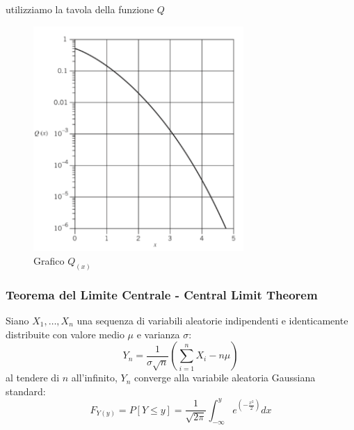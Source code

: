             utilizziamo la tavola della funzione $Q$
            \begin{figure}[H]
                \centering
                \includegraphics[width = 8cm]{media/grafo funzione q.png}
                \caption{Grafico $Q_{(x)}$}
            \end{figure}
        \subsubsection{Teorema del Limite Centrale - Central Limit Theorem}\label{Teorema del Limite Centrale - Central Limit Theorem}
            Siano $X_1,\dots,X_n$ una sequenza di variabili aleatorie indipendenti e identicamente distribuite con valore medio $\mu$ e varianza $\sigma$:
            \[
                Y_n = \frac{1}{\sigma\sqrt{n}}\left(\sum_{i=1}^{n}X_i-n\mu\right)    
            \]
            al tendere di $n$ all'infinito, $Y_n$ converge alla variabile aleatoria Gaussiana standard:
            \[
                F_{Y(y)} =P[Y\leq y] = \frac{1}{\sqrt{2\pi}} \int_{-\infty}^{y}e^{\left(-\frac{x^2}{2}\right)}dx    
            \]
